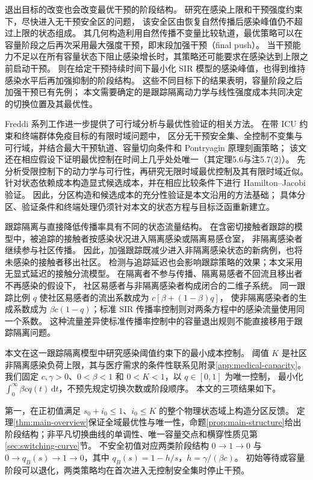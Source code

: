 \documentclass[11pt,a4paper,UTF8]{ctexart}
\theoremstyle{definition}
\newcommand{\dd}{\,\mathrm d}
\begin{document}
退出目标的改变也会改变最优干预的阶段结构。
\citet{Angulo2021}研究在感染上限和干预强度约束下，尽快进入无干预安全区的问题，
该安全区由恢复自然传播后感染峰值仍不超过上限的状态组成。
其几何构造利用自然传播不变量比较轨道，最优策略可以在容量阶段之后再次采用最大强度干预，即末段加强干预（final push）。
当干预能力不足以在所有容量状态下阻止感染增长时，其策略还可能要求在感染达到上限之前启动干预\citep[图3b]{Angulo2021}。
\citet{Morris2021}则在给定干预持续时间下最小化 SIR 模型的感染峰值，也得到维持感染水平后再加强抑制的阶段结构。
这些不同目标下的结果表明，容量阶段之后加强干预已有先例；
本文需要确定的是跟踪隔离动力学与线性强度成本共同决定的切换位置及其最优性。

Freddi 系列工作进一步提供了可行域分析与最优性验证的相关方法。
\citet{AvramFreddiGoreac2022}在带 ICU 约束和终端群体免疫目标的有限时域问题中，
区分无干预安全集、全控制不变集与可行域，并结合最大干预轨道、容量切向条件和 Pontryagin 原理刻画策略；
该文还在相应假设下证明最优控制在时间上几乎处处唯一（其定理5.6与注5.7(2)）。
\citet{FreddiGoreac2024}先分析受限控制下的动力学与可行性，再研究无限时域最优控制及其有限时域近似。
\citet{FreddiGoreacLiXu2022}针对状态依赖成本构造显式候选成本，并在相应比较条件下进行 Hamilton--Jacobi 验证。
因此，分区构造和候选成本的充分性验证是本文沿用的方法基础；
具体分区、验证条件和终端处理仍须针对本文的状态方程与目标泛函重新建立。

跟踪隔离与直接降低传播率具有不同的状态流量结构。
在含密切接触者跟踪的模型中，被追踪的接触者按感染状况进入隔离感染或隔离易感仓室，
非隔离感染者继续参与社区传播\citep{Zhou2024SPCI}。
因此，加强跟踪既减少进入非隔离感染状态的新病例，也将未感染的接触者移出社区。
检测与追踪延迟也会影响跟踪策略的效果\citep{Kretzschmar2020}；本文采用无显式延迟的接触分流模型。
在隔离者不参与传播、隔离易感者不回流且移出者不再感染的假设下，
社区易感者与非隔离感染者构成闭合的二维子系统。
同一跟踪比例 $q$ 使社区易感者的流出系数成为 $c[\beta+(1-\beta)q]$，
使非隔离感染者的生成系数成为 $\beta c(1-q)$；标准 SIR 传播率控制则对两条方程中的感染流量使用同一个系数。
这种流量差异使标准传播率控制中的容量退出规则不能直接移用于跟踪隔离问题。

本文在这一跟踪隔离模型中研究感染阈值约束下的最小成本控制。
阈值 $K$ 是社区非隔离感染负荷上限，其与医疗需求的条件性联系见附录\ref{app:medical-capacity}。
我们固定 $c,\gamma>0$、$0<\beta<1$ 和 $0<K<1$，以 $q\in[0,1]$ 为唯一控制，
最小化 $\int_0^\infty\beta cq(t)\dd t$，不预先规定切换次数或阶段顺序。
本文的三项结果如下。

第一，在正初值满足 $s_0+i_0\le1$、$i_0\le K$ 的整个物理状态域上构造分区反馈。
定理\ref{thm:main-overview}保证全域最优性与唯一性，命题\ref{prop:main-structure}给出阶段结构；非平凡切换曲线的单调性、唯一容量交点和横穿性质见第\ref{sec:switching-curve}节。
不安全初值对应两类阶段结构
$0\to1\to0$ 与 $0\to q_B(s)\to1\to0$，其中 $q_B(s)=1-h/s$，$h=\gamma/(\beta c)$。
初始等待或容量阶段可以退化，两类策略均在首次进入无控制安全集时停止干预。
\end{document}
